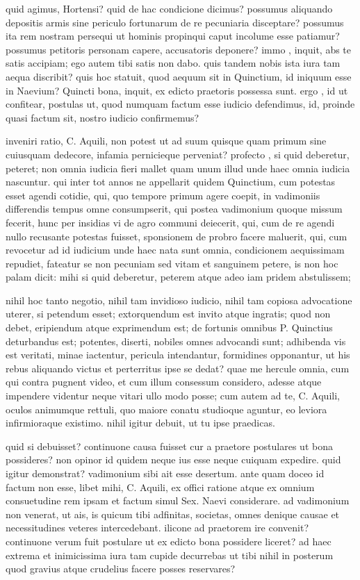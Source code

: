  quid agimus, Hortensi? quid de hac condicione dicimus? possumus aliquando depositis armis sine periculo fortunarum de re pecuniaria disceptare? possumus ita rem nostram persequi ut hominis propinqui caput incolume esse patiamur? possumus petitoris personam capere, accusatoris deponere? immo , inquit, abs te satis accipiam; ego autem tibi satis non dabo. quis tandem nobis ista iura tam aequa discribit? quis hoc statuit, quod aequum sit in Quinctium, id iniquum esse in Naevium? Quincti bona, inquit, ex edicto praetoris possessa sunt. ergo , id ut confitear, postulas ut, quod numquam factum esse iudicio defendimus, id, proinde quasi factum sit, nostro iudicio confirmemus?

 inveniri ratio, C. Aquili, non potest ut ad suum quisque quam primum sine cuiusquam dedecore, infamia pernicieque perveniat? profecto , si quid deberetur, peteret; non omnia iudicia fieri mallet quam unum illud unde haec omnia iudicia nascuntur. qui inter tot annos ne appellarit quidem Quinctium, cum potestas esset agendi cotidie, qui, quo tempore primum agere coepit, in vadimoniis differendis tempus omne consumpserit, qui postea vadimonium quoque missum fecerit, hunc per insidias vi de agro communi deiecerit, qui, cum de re agendi nullo recusante potestas fuisset, sponsionem de probro facere maluerit, qui, cum revocetur ad id iudicium unde haec nata sunt omnia, condicionem aequissimam repudiet, fateatur se non pecuniam sed vitam et sanguinem petere, is non hoc palam dicit: mihi si quid deberetur, peterem atque adeo iam pridem abstulissem;

 nihil hoc tanto negotio, nihil tam invidioso iudicio, nihil tam copiosa advocatione uterer, si petendum esset; extorquendum est invito atque ingratis; quod non debet, eripiendum atque exprimendum est; de fortunis omnibus P. Quinctius deturbandus est; potentes, diserti, nobiles omnes advocandi sunt; adhibenda vis est veritati, minae iactentur, pericula intendantur, formidines opponantur, ut his rebus aliquando victus et perterritus ipse se dedat? quae me hercule omnia, cum qui contra pugnent video, et cum illum consessum considero, adesse atque impendere videntur neque vitari ullo modo posse; cum autem ad te, C. Aquili, oculos animumque rettuli, quo maiore conatu studioque aguntur, eo leviora infirmioraque existimo. nihil igitur debuit, ut tu ipse praedicas.

 quid si debuisset? continuone causa fuisset cur a praetore postulares ut bona possideres? non opinor id quidem neque ius esse neque cuiquam expedire. quid igitur demonstrat? vadimonium sibi ait esse desertum. ante quam doceo id factum non esse, libet mihi, C. Aquili, ex offici ratione atque ex omnium consuetudine rem ipsam et factum simul Sex. Naevi considerare. ad vadimonium non venerat, ut ais, is quicum tibi adfinitas, societas, omnes denique causae et necessitudines veteres intercedebant. ilicone ad praetorem ire convenit? continuone verum fuit postulare ut ex edicto bona possidere liceret? ad haec extrema et inimicissima iura tam cupide decurrebas ut tibi nihil in posterum quod gravius atque crudelius facere posses reservares?

